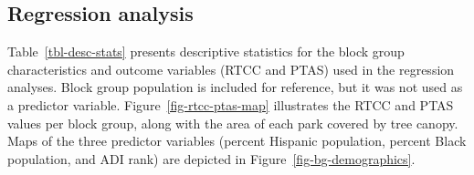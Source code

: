 \documentclass[
  sn-basic,
]{sn-jnl}
\begin{document}
\begin{table}

\caption{\label{tbl-ttcc-rtcc}Total tree canopy cover (TTCC) and
residential tree canopy cover (RTCC) in block groups that contain parks}


\end{table}%

\subsection{Regression analysis}\label{sec-res-regress}

Table~\ref{tbl-desc-stats} presents descriptive statistics for the block
group characteristics and outcome variables (RTCC and PTAS) used in the
regression analyses. Block group population is included for reference,
but it was not used as a predictor variable.
Figure~\ref{fig-rtcc-ptas-map} illustrates the RTCC and PTAS values per
block group, along with the area of each park covered by tree canopy.
Maps of the three predictor variables (percent Hispanic population,
percent Black population, and ADI rank) are depicted in
Figure~\ref{fig-bg-demographics}.
\end{document}
